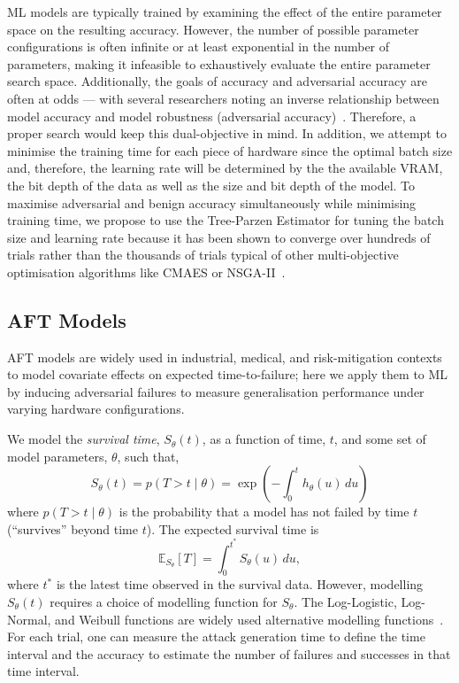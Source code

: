 \documentclass[conference]{IEEEtran}%
\begin{document}
ML models are typically trained by examining the effect of the entire parameter space on the resulting accuracy. 
However, the number of possible parameter configurations is often infinite or at least exponential in the number of parameters,
making it infeasible to exhaustively evaluate the entire parameter search space. 
Additionally, the goals of accuracy and adversarial accuracy are often at odds --- with several researchers noting an inverse relationship between model accuracy and model robustness (adversarial accuracy)~\cite{carlini_towards_2017,meyers,dohmatob_generalized_2019}. 
Therefore, a proper search would keep this dual-objective in mind.
In addition, we attempt to minimise the training time for each piece of hardware since the optimal batch size and, therefore, the learning rate will be determined by the the available VRAM, the bit depth of the data as well as the size and bit depth of the model.
To maximise adversarial and benign accuracy simultaneously while minimising training time, we propose to use the Tree-Parzen Estimator for tuning the batch size and learning rate because it has been shown to converge over hundreds of trials rather than the thousands of trials typical of other multi-objective optimisation algorithms like CMAES or NSGA-II~\cite{ozaki2020multiobjective,optuna,tpe_params}.




\subsection{AFT Models}
\label{survival_time}

AFT models are widely used in industrial, medical, and risk-mitigation contexts~\cite{kleinbaum1996survival,aft_models} to model covariate effects on expected time-to-failure; here we apply them to ML by inducing adversarial failures to measure generalisation performance under varying hardware configurations.

We model the \textit{survival time}, $S_{\theta}(t)$, as a function of time, $t$, and some set of model parameters, $\theta$, such that,
\[
    S_{\theta}(t) = p(T>t \mid \theta) = \exp\left(-\int_0^t h_{\theta}(u) \, du\right)
\]
where $p(T>t \mid \theta)$ is the probability that a model has not failed by time $t$ (``survives'' beyond time $t$). 
The expected survival time is
\begin{equation}
	\mathbb{E}_{S_\theta}[T] = \int_0^{t^*} S_\theta(u) \,du,
    \label{eq:expectation}
\end{equation}
where $t^*$ is the latest time observed in the survival data. However, modelling $S_{\theta}(t)$ requires a choice of modelling function for $S_{\theta}$. 
The Log-Logistic, Log-Normal, and Weibull functions are widely used alternative modelling functions~\cite{kleinbaum1996survival,meyers_aft}. 
For each trial, one can measure the attack generation time to define the time interval and the accuracy to estimate the number of failures and successes in that time interval.
\end{document}
